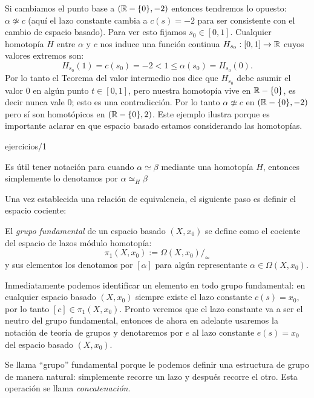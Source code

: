 \documentclass[../../topologia_algebraica]{subfiles}
\begin{document}
\begin{ejemplo}
\begin{enumerate}
    Si cambiamos el punto base a $(\mathbb{R}-\{0\},-2)$ entonces tendremos lo opuesto: $\alpha\not\simeq c$
    (aqu\'i el lazo constante cambia a $c(s)=-2$ para ser consistente con el cambio de espacio basado).
    Para ver esto fijamos $s_0\in[0,1]$. Cualquier homotop\'ia $H$ entre $\alpha$ y $c$ nos induce
    una funci\'on continua $H_{s_0}:[0,1]\rightarrow\mathbb{R}$ cuyos valores extremos son:
    \[
      H_{s_0}(1)=c(s_0)=-2<1\leq \alpha(s_0)=H_{s_0}(0).
    \]
    Por lo tanto el Teorema del valor intermedio nos dice que $H_{s_0}$ debe asumir el valor $0$ en
    alg\'un punto $t\in[0,1]$, pero nuestra homotop\'ia vive en $\mathbb{R}-\{0\}$, es decir nunca vale 0;
    esto es una contradicci\'on. Por lo tanto $\alpha\not\simeq c$ en $(\mathbb{R}-\{0\},-2)$ pero s\'i son
    homot\'opicos en $(\mathbb{R}-\{0\},2)$. Este ejemplo ilustra porque es importante aclarar en que espacio
    basado estamos considerando las homotop\'ias.
  \end{enumerate}
\end{ejemplo}

{ejercicios/1}%

\begin{nota}
  Es \'util tener notaci\'on para cuando $\alpha\simeq\beta$ mediante una homotop\'ia $H$, entonces
  simplemente lo denotamos por $\alpha\simeq_H\beta$
\end{nota}

Una vez establecida una relaci\'on de equivalencia, el siguiente paso es definir el espacio cociente:
\begin{defin}
  El \emph{grupo fundamental} de un espacio basado $(X,x_0)$ se define como el cociente del espacio de
  lazos m\'odulo homotop\'ia:
  \[
    \pi_1(X,x_0):=\Omega(X,x_0)/_{\simeq}
  \]
  y sus elementos los denotamos por $[\alpha]$ para alg\'un representante $\alpha\in\Omega(X,x_0)$.
\end{defin}

Inmediatamente podemos identificar un elemento en todo grupo fundamental: en cualquier espacio basado
$(X,x_0)$ siempre existe el lazo constante $c(s)=x_0$, por lo tanto $[c]\in\pi_1(X,x_0)$. Pronto veremos
que el lazo constante va a ser el neutro del grupo fundamental, entonces de ahora en adelante usaremos
la notaci\'on de teor\'ia de grupos y denotaremos por $e$ al lazo constante $e(s)=x_0$ del espacio
basado $(X,x_0)$.

Se llama ``grupo'' fundamental porque le podemos definir una estructura de grupo de manera natural:
simplemente recorre un lazo y despu\'es recorre el otro. Esta operaci\'on se llama
\emph{concatenaci\'on}.
\end{document}
